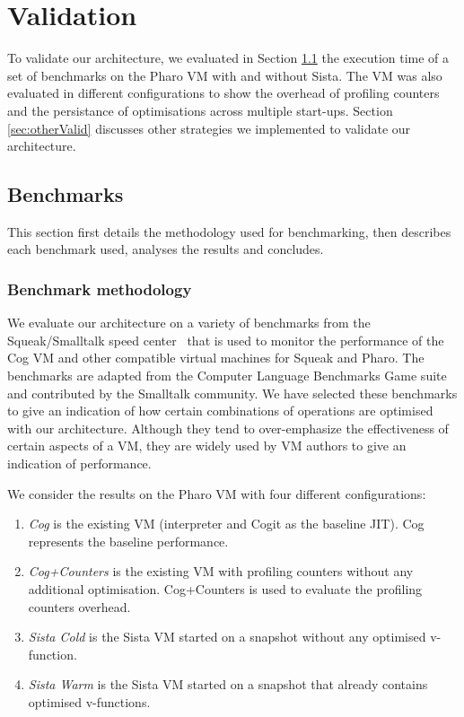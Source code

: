 \documentclass[a4paper,12pt,twoside]{../includes/ThesisStyle}
\begin{document}
\fi

\chapter{Validation}
\label{chap:validation}
\minitoc


To validate our architecture, we evaluated in Section \ref{sec:bench} the execution time of a set of benchmarks on the Pharo VM with and without Sista. The VM was also evaluated in different configurations to show the overhead of profiling counters and the persistance of optimisations across multiple start-ups. Section \ref{sec:otherValid} discusses other strategies we implemented to validate our architecture.

\section{Benchmarks}
\label{sec:bench}

This section first details the methodology used for benchmarking, then describes each benchmark used, analyses the results and concludes.

\subsection{Benchmark methodology}

We evaluate our architecture on a variety of benchmarks from the Squeak/Smalltalk speed center~\cite{Felg16a} that is used to monitor the performance of the Cog VM and other compatible virtual machines for Squeak and Pharo. The benchmarks are adapted from the Computer Language Benchmarks Game suite \cite{GameBenchs} and contributed by the Smalltalk community. We have selected these benchmarks to give an indication of how certain combinations of operations are optimised with our architecture. Although they tend to over-emphasize the effectiveness of certain aspects of a VM, they are widely used by VM authors to give an indication of performance.

We consider the results on the Pharo VM with four different configurations:
\begin{enumerate}
	\item \emph{Cog} is the existing VM (interpreter and Cogit as the baseline JIT). Cog represents the baseline performance.
	\item \emph{Cog+Counters} is the existing VM with profiling counters without any additional optimisation. Cog+Counters is used to evaluate the profiling counters overhead.
	\item \emph{Sista Cold} is the Sista VM started on a snapshot without any optimised v-function.
	\item \emph{Sista Warm} is the Sista VM started on a snapshot that already contains optimised v-functions.
\end{enumerate}
\end{document}
